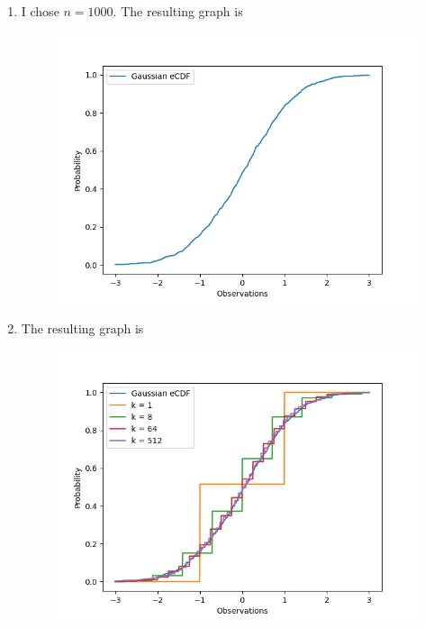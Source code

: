 \documentclass[submit]{harvardml}
\begin{document}
\begin{enumerate}
\begin{enumerate}
  \newpage
  \item 
  I chose $n=1000$. The resulting graph is
  \begin{figure}[h]
  \includegraphics[width=15cm]{ps0_1}
  \centering
  \end{figure}

  \newpage
  \item 
  The resulting graph is
  \begin{figure}[h]
  \includegraphics[width=15cm]{ps0_2}
  \centering
  \end{figure}
\end{enumerate}

\end{enumerate}
\end{document}
